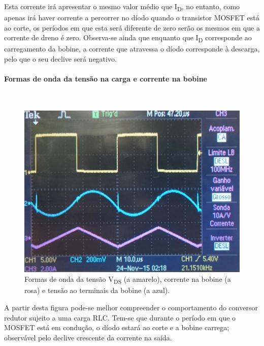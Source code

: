 \documentclass[a4paper,11pt]{article}
\numberwithin{equation}{section}
\begin{document}
Esta corrente irá apresentar o mesmo valor médio que I\textsubscript{D}, no entanto, como apenas irá haver corrente a percorrer no díodo quando o transistor MOSFET está ao corte, os períodos em que esta será diferente de zero serão os mesmos em que a corrente de dreno é zero. Observa-se ainda que enquanto que I\textsubscript{D} corresponde ao carregamento da bobine, a corrente que atravessa o díodo corresponde à descarga, pelo que o seu declive será negativo.

\pagebreak

\paragraph{Formas de onda da tensão na carga e corrente na bobine}\mbox{}\

\begin{figure}[H]
	\centering
	\includegraphics[keepaspectratio=true, scale=0.15]{img/figs/tensao_carga_corrente_bobine_ac_rlcbuck}
	\caption{Formas de onda da tensão V\textsubscript{DS} (a amarelo), corrente na bobine (a rosa) e tensão ao terminais da bobine (a azul).}
	\label{fig:tensao_carga_corrente_bobine_ac_rlcbuck}
	\vspace{-0.8em}
\end{figure} 


A partir desta figura pode-se melhor compreender o comportamento do conversor redutor sujeito a uma carga RLC. Tem-se que durante o período em que o MOSFET está em condução, o díodo estará ao corte e a bobine carrega; observável pelo declive crescente da corrente na saída. 
\end{document}
